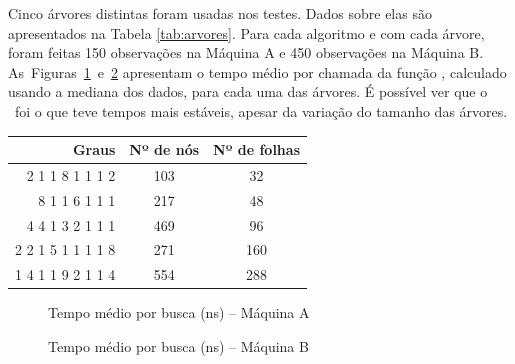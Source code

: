 


Cinco árvores distintas foram usadas nos testes.
Dados sobre elas são apresentados na Tabela \ref{tab:arvores}.
Para cada algoritmo e com cada árvore, foram feitas 150 observações na Máquina A e 450 observações na Máquina B.
As~Figuras~\ref{fig:t_medio_a}~e~\ref{fig:t_medio_b} apresentam o tempo médio por chamada da função \fACMP, calculado usando a mediana dos dados, para cada uma das árvores.
É possível ver que o \Novo\ foi o que teve tempos mais estáveis, apesar da variação do tamanho das árvores.

\begin{table}[htb]
	{%
	\begin{tabular}{rcc}
		\toprule
		Graus & Nº de nós & Nº de folhas \\
		\midrule 
		2 1 1 8 1 1 1 2
			& 103 & 32 \\
		8 1 1 6 1 1 1
			& 217 & 48 \\
		4 4 1 3 2 1 1 1
			& 469 & 96 \\
		2 2 1 5 1 1 1 1 8
			& 271 & 160 \\
		1 4 1 1 9 2 1 1 4
			& 554 & 288 \\
		\bottomrule
	\end{tabular}}{}%
\end{table}


\begin{figure}[h]
	\caption{Tempo médio por busca (ns) -- Máquina A}
	\label{fig:t_medio_a}
	\resizebox{\textwidth}{!}{}
\end{figure}

\begin{figure}[h]
	\caption{Tempo médio por busca (ns) -- Máquina B}
	\label{fig:t_medio_b}
	\resizebox{\textwidth}{!}{}
\end{figure}
